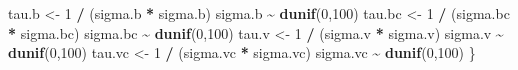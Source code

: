 \documentclass[
]{article}
\newenvironment{Shaded}{\begin{snugshade}}{\end{snugshade}}
\newcommand{\DecValTok}[1]{\textcolor[rgb]{0.00,0.00,0.81}{#1}}
\newcommand{\FunctionTok}[1]{\textcolor[rgb]{0.13,0.29,0.53}{\textbf{#1}}}
\newcommand{\NormalTok}[1]{#1}
\newcommand{\OtherTok}[1]{\textcolor[rgb]{0.56,0.35,0.01}{#1}}
\newcommand{\SpecialCharTok}[1]{\textcolor[rgb]{0.81,0.36,0.00}{\textbf{#1}}}
\begin{document}
\begin{Shaded}
\begin{Highlighting}[]
\NormalTok{tau.b }\OtherTok{\textless{}{-}} \DecValTok{1} \SpecialCharTok{/}\NormalTok{ (sigma.b }\SpecialCharTok{*}\NormalTok{ sigma.b)}
\NormalTok{sigma.b }\SpecialCharTok{\textasciitilde{}} \FunctionTok{dunif}\NormalTok{(}\DecValTok{0}\NormalTok{,}\DecValTok{100}\NormalTok{)}
\NormalTok{tau.bc }\OtherTok{\textless{}{-}} \DecValTok{1} \SpecialCharTok{/}\NormalTok{ (sigma.bc }\SpecialCharTok{*}\NormalTok{ sigma.bc)}
\NormalTok{sigma.bc }\SpecialCharTok{\textasciitilde{}} \FunctionTok{dunif}\NormalTok{(}\DecValTok{0}\NormalTok{,}\DecValTok{100}\NormalTok{)}
\NormalTok{tau.v }\OtherTok{\textless{}{-}} \DecValTok{1} \SpecialCharTok{/}\NormalTok{ (sigma.v }\SpecialCharTok{*}\NormalTok{ sigma.v)}
\NormalTok{sigma.v }\SpecialCharTok{\textasciitilde{}} \FunctionTok{dunif}\NormalTok{(}\DecValTok{0}\NormalTok{,}\DecValTok{100}\NormalTok{)}
\NormalTok{tau.vc }\OtherTok{\textless{}{-}} \DecValTok{1} \SpecialCharTok{/}\NormalTok{ (sigma.vc }\SpecialCharTok{*}\NormalTok{ sigma.vc)}
\NormalTok{sigma.vc }\SpecialCharTok{\textasciitilde{}} \FunctionTok{dunif}\NormalTok{(}\DecValTok{0}\NormalTok{,}\DecValTok{100}\NormalTok{)}
\NormalTok{\}}


\end{Highlighting}
\end{Shaded}
\end{document}

